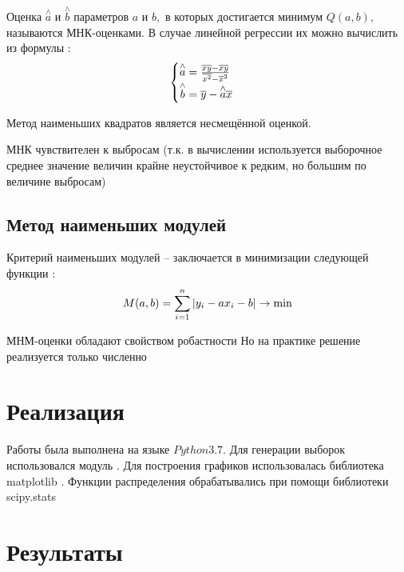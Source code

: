 \documentclass[12pt]{report}
\begin{document}
Оценка $\overset{\wedge}{a}$ и $\overset{\wedge}{b}$ параметров $a$ и $b,$ в которых достигается минимум $Q(a,b),$ называются МНК-оценками. В случае линейной регрессии их можно вычислить из формулы \cite{6_3}:
\begin{equation}
    \begin{cases}
    \overset{\wedge}{a} = \frac{\overline{x y}-\overline{x}\overline{y}}{\overline{x^2}-\overline{x}^2}\\
    \overset{\wedge}{b} = \overline{y}-\overset{\wedge}{a}\overline{x}
    \end{cases}\hfill
\end{equation}

Метод наименьших квадратов является несмещённой оценкой.

МНК чувствителен к выбросам (т.к. в вычислении используется выборочное среднее значение величин крайне неустойчивое к редким, но большим по величине выбросам)

\subsection{Метод наименьших модулей}
Критерий наименьших модулей – заключается в минимизации следующей функции \cite{6_4}:
\begin{equation}
    M(a,b) = \sum\limits_{i=1}^n\vert y_i-ax_i-b\vert\to\min\hfill
\end{equation}

МНМ-оценки обладают свойством робастности
Но на практике решение реализуется только численно

\section{Реализация}

Работы была выполнена на языке $Python 3.7.$
Для генерации выборок использовался модуль \cite{numpy}.
Для построения графиков использовалась библиотека matplotlib \cite{plotlib}.
Функции распределения обрабатывались при помощи библиотеки scipy.stats \cite{skp}

\section{Результаты}
\end{document}
